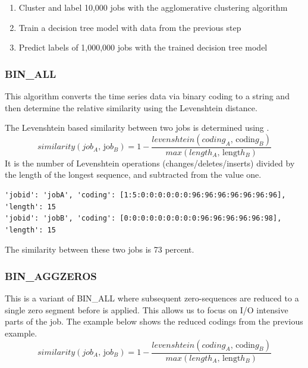\documentclass[]{llncs}
\begin{document}
\begin{enumerate}
 \item Cluster and label 10,000 jobs with the agglomerative clustering algorithm
 \item Train a decision tree model with data from the previous step
 \item Predict labels of 1,000,000 jobs with the trained decision tree model
\end{enumerate}

\subsubsection{BIN\_ALL}
This algorithm converts the time series data via binary coding to a string and then determine the relative similarity using the Levenshtein distance.

The Levenshtein based similarity between two jobs is determined using .
\begin{equation}
similarity \left( job_{A}\text{, jo}b_{B} \right) =1- \frac{levenshtein \left( coding_{A}\text{, codin}g_{B} \right) }{max \left( length_{A}\text{, lengt}h_{B} \right) } \label{eq:lev}
\end{equation}
It is the number of Levenshtein operations (changes/deletes/inserts) divided by the length of the longest sequence, and subtracted from the value one.

\begin{lstlisting}
'jobid': 'jobA', 'coding': [1:5:0:0:0:0:0:0:96:96:96:96:96:96:96], 'length': 15
'jobid': 'jobB', 'coding': [0:0:0:0:0:0:0:0:0:96:96:96:96:96:98], 'length': 15
\end{lstlisting}

The similarity between these two jobs is 73 percent.

\subsubsection{BIN\_AGGZEROS}
This is a variant of BIN\_ALL where subsequent zero-sequences are reduced to a single zero segment before  is applied.
This allows us to focus on I/O intensive parts of the job.
The example below shows the reduced codings from the previous example.
\begin{equation}
similarity \left( job_{A}\text{, jo}b_{B} \right) =1- \frac{levenshtein \left( coding_{A}\text{, codin}g_{B} \right) }{max \left( length_{A}\text{, lengt}h_{B} \right) }
\end{equation}
\end{document}
